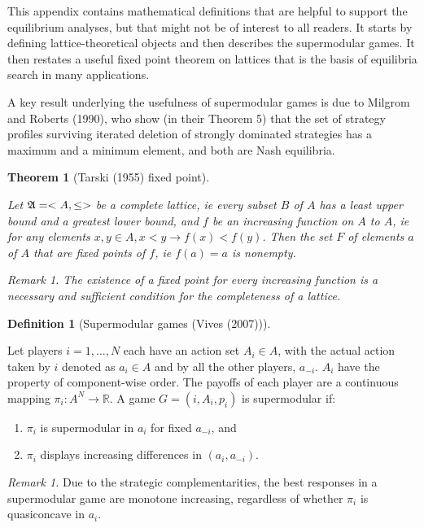\documentclass[
]{article}
\theoremstyle{definition}
\newtheorem{definition}{Definition}[section]
\theoremstyle{plain}
\newtheorem{theorem}{Theorem}[section]
\theoremstyle{remark}
\begin{document}
This appendix contains mathematical definitions that are helpful to
support the equilibrium analyses, but that might not be of interest to
all readers. It starts by defining lattice-theoretical objects and then
describes the supermodular games. It then restates a useful fixed point
theorem on lattices that is the basis of equilibria search in many
applications.

A key result underlying the usefulness of supermodular games is due to
Milgrom and Roberts (1990), who show (in their Theorem 5) that the set
of strategy profiles surviving iterated deletion of strongly dominated
strategies has a maximum and a minimum element, and both are Nash
equilibria.

\begin{theorem}[Tarski (1955) fixed
point]\protect\hypertarget{thm-fixedpoint}{}\label{thm-fixedpoint}

Let \(\frak{A} = <A, \leq>\) be a complete lattice, ie every subset
\(B\) of \(A\) has a least upper bound and a greatest lower bound, and
\(f\) be an increasing function on \(A\) to \(A\), ie for any elements
\(x, y \in A, x < y \to f(x) < f(y)\). Then the set \(F\) of elements
\(a\) of \(A\) that are fixed points of \(f\), ie \(f(a) = a\) is
nonempty.

\emph{Remark 1.} The existence of a fixed point for \emph{every}
increasing function is a necessary and sufficient condition for the
completeness of a lattice.

\end{theorem}

\begin{definition}[Supermodular games (Vives
(2007))]\protect\hypertarget{def-supermodular}{}\label{def-supermodular}

Let players \(i= 1, \dots, N\) each have an action set \(A_i \in A\),
with the actual action taken by \(i\) denoted as \(a_i \in A\) and by
all the other players, \(a_{-i}\). \(A_i\) have the property of
component-wise order. The payoffs of each player are a continuous
mapping \(\pi_i : A^N \to \mathbb{R}\). A game \(G = (i, A_i, p_i)\) is
supermodular if:

\begin{enumerate}
\def\labelenumi{\arabic{enumi}.}
\item
  \(\pi_i\) is supermodular in \(a_i\) for fixed \(a_{-i}\), and
\item
  \(\pi_i\) displays increasing differences in \((a_i, a_{-i})\).
\end{enumerate}

\emph{Remark 1.} Due to the strategic complementarities, the best
responses in a supermodular game are monotone increasing, regardless of
whether \(\pi_i\) is quasiconcave in \(a_i\).

\end{definition}
\end{document}
